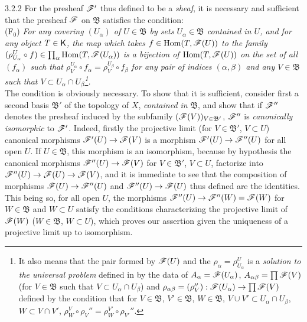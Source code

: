 \begin{env}{3.2.2}
\label{env-0.3.2.2}
For the presheaf $\mathscr{F}'$ thus defined to be a \emph{sheaf}, it is necessary and sufficient
that the presheaf $\mathscr{F}$ on $\mathfrak{B}$ satisfies the condition:\\

(F$_0$) \emph{For any covering $(U_\alpha)$ of $U\in\mathfrak{B}$ by sets
        $U_\alpha\in\mathfrak{B}$ contained in $U$, and for any object $T\in\mathsf{K}$, the map
        which takes $f\in{\mathop{\mathrm{Hom}}\nolimits}(T,\mathscr{F}(U))$ to the family
        $(\rho_{U_\alpha}^U\circ f)\in\prod_\alpha{\mathop{\mathrm{Hom}}\nolimits}(T,\mathscr{F}(U_\alpha))$ is a bijection of
        ${\mathop{\mathrm{Hom}}\nolimits}(T,\mathscr{F}(U))$ on the set of all $(f_\alpha)$ such that
        $\rho_V^{U_\alpha}\circ f_\alpha=\rho_V^{U_\beta}\circ f_\beta$ for any pair of
        indices $(\alpha,\beta)$ and any $V\in\mathfrak{B}$ such that
        $V\subset U_\alpha\cap U_\beta$\footnote{It also means that the pair formed by
        $\mathscr{F}(U)$ and the $\rho_\alpha=\rho_{U_\alpha}^U$ is a \emph{solution to the
        universal problem} defined in  by the data of
        $A_\alpha=\mathscr{F}(U_\alpha)$, $A_{\alpha\beta}=\prod\mathscr{F}(V)$ (for $V\in\mathfrak{B}$
        such that $V\subset U_\alpha\cap U_\beta$) and
        $\rho_{\alpha\beta}=(\rho_V''):\mathscr{F}(U_\alpha)\to\prod\mathscr{F}(V)$ defined by the
        condition that for $V\in\mathfrak{B}$, $V'\in\mathfrak{B}$, $W\in\mathfrak{B}$,
        $V\cup V'\subset U_\alpha\cap U_\beta$, $W\subset V\cap V'$,
        $\rho_W^V\circ\rho_V''=\rho_W^{V'}\circ\rho_{V'}''$.}.}\\

The condition is obviously necessary. To show that it is sufficient, consider first a second
basis $\mathfrak{B}'$ of the topology of $X$, \emph{contained in} $\mathfrak{B}$, and show
that if $\mathscr{F}''$ denotes the presheaf induced by the subfamily
$(\mathscr{F}(V))_{V\in\mathfrak{B}'}$, $\mathscr{F}''$ is \emph{canonically isomorphic} to $\mathscr{F}'$.
Indeed, firstly the projective limit (for $V\in\mathfrak{B}'$, $V\subset U$) canonical
morphisms ${\mathscr{F}'(U)\to\mathscr{F}(V)}$ is a morphism $\mathscr{F}'(U)\to\mathscr{F}''(U)$ for all open
$U$. If $U\in\mathfrak{B}$, this morphism is an isomorphism, because by hypothesis the
canonical morphisms $\mathscr{F}''(U)\to\mathscr{F}(V)$ for $V\in\mathfrak{B}'$, $V\subset U$,
factorize into $\mathscr{F}''(U)\to\mathscr{F}(U)\to\mathscr{F}(V)$, and it is immediate to see that the
composition of morphisms $\mathscr{F}(U)\to\mathscr{F}''(U)$ and $\mathscr{F}''(U)\to\mathscr{F}(U)$ thus defined
are the identities. This being so, for all open $U$, the morphisms
$\mathscr{F}''(U)\to\mathscr{F}''(W)=\mathscr{F}(W)$ for $W\in\mathfrak{B}$ and $W\subset U$ satisfy the
conditions characterizing the projective limit of $\mathscr{F}(W)$ ($W\in\mathfrak{B}$,
$W\subset U$), which proves our assertion given the uniqueness of a projective limit up
to isomorphism.


\end{env}
